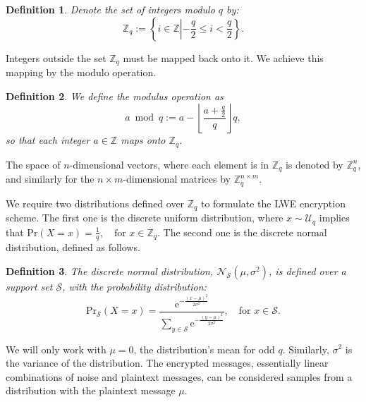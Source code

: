\documentclass[journal, twoside, web]{ieeecolorpreprint}
\newtheorem{defi}{Definition}
\begin{document}
\begin{defi}
    Denote the set of integers modulo $q$ by: $$  \mathbb{Z}_q:= \left\{i\in\mathbb{Z}  
    \left \vert -\frac{q}{2}   \leq i <\frac{q}{2} \right. \right \}.$$
\end{defi}

Integers outside the set $\mathbb{Z}_q$ must be mapped back onto it. We achieve this mapping by the modulo operation.
\begin{defi}
    We define the modulus operation as $$  a\bmod q := a - \left\lfloor\frac{a+ \frac{q}{2} }{q}\right\rfloor q, $$ so that each integer $a\in \mathbb{Z}$ maps onto $\mathbb{Z}_q$. 
\end{defi}
The space of $n$-dimensional vectors, where each element is in $\mathbb{Z}_q$ is denoted by $ \mathbb{Z}_q^n$, and similarly for the ${n \times m}$-dimensional matrices by $\mathbb{Z}_q^{n\times m}$.

We require two distributions defined over $\mathbb{Z}_q$ to formulate the LWE encryption scheme. The first one is the discrete uniform distribution, where $x \sim  \mathcal{U}_{q}$ implies that $\mathrm{Pr}(X=x) = \frac{1}{q}, \quad \text{for } x \in \mathbb Z_q$. The second one is the discrete normal distribution, defined as follows.

\begin{defi}\label{def:discretenormal}
    The discrete normal distribution, $\mathcal{N}_\mathcal{S} (\mu, \sigma^2)$, is defined over a support set $\mathcal{S}$, with the probability distribution:
    \begin{equation*}
        \mathrm{Pr}_\mathcal{S}(X=x)=\frac{\mathrm{e}^{-\frac{(x-\mu)^2}{2\sigma^2}}}{\sum \limits_{y \in \mathcal{S}}\mathrm{e}^{-\frac{(y-\mu)^2}{2\sigma^2}}}, \quad \text{for } x \in \mathcal{S}.
    \end{equation*}
\end{defi}
We will only work with $\mu = 0$, the distribution's mean for odd $q$. Similarly, $\sigma^2$ is the variance of the distribution. The encrypted messages, essentially linear combinations of noise and plaintext messages, can be considered samples from a distribution with the plaintext message $\mu$.
\end{document}
